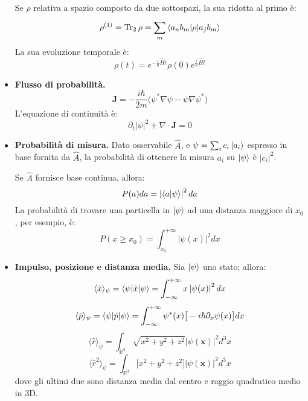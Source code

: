 \documentclass[11pt, a4paper]{scrartcl} %
\numberwithin{equation}{section}
\theoremstyle{style2}
\theoremstyle{style1}
\begin{document}
\begin{multicols}{2}
\begin{itemize}
		Se $\rho $ relativa a spazio composto da due sottospazi, la sua ridotta al primo \`e:
		\begin{equation}
			\rho ^{(1)} = \operatorname{Tr} _2 \rho = \sum_{m}^{} \braket{a_n b_m|\rho |a_j b_m} 
		\end{equation}
		La sua evoluzione temporale \`e:
		\begin{equation}
			\rho (t) = e^{-\frac{i}{\hbar } \hat{H} t } \rho (0) e^{\frac{i}{\hbar }\hat{H} t} 
		\end{equation}
		\item {\sffamily \bfseries Flusso di probabilit\`a.} 
			\begin{equation}
				\mathbf{J} = - \frac{i\hbar }{2m} \big(\psi ^* \nabla \psi - \psi  \nabla \psi ^*\big)
			\end{equation}
			L'equazione di continuit\`a \`e:
			\begin{equation}
				\partial _t \lvert \psi  \rvert ^2 + \nabla \cdot \mathbf{J} = 0
			\end{equation}
		\item {\sffamily \bfseries Probabilit\`a di misura.} Dato osservabile $\hat{A}$, e $\psi = \sum_{i}^{} c_i \ket{a _i} $ espresso in base fornita da $\hat{A}$, la probabilit\`a di ottenere la misura $a_i$ su $\ket{\psi } $ \`e $\lvert c_i \rvert ^2$.

			Se $\hat{A}$ fornisce base continua, allora:
			\begin{equation}
				P(a) da =\left\lvert \braket{a|\psi }  \right\rvert ^2 da 
			\end{equation}
			La probabilit\`a di trovare una particella in $\ket{\psi } $ ad una distanza maggiore di $x_0$, per esempio, \`e:
			\[
			P(x\ge x_0) = \int_{x_0}^{+\infty}  \left\lvert \psi (x) \right\rvert ^2 dx
			\] 
		\item {\sffamily \bfseries Impulso, posizione e distanza media.} Sia $\ket{\psi } $ uno stato; allora:
			\begin{equation*}
				\langle \hat{x} \rangle_\psi = \braket{\psi |\hat{x}|\psi }  = \int_{-\infty} ^{+\infty} x \left\lvert \psi (x) \right\rvert ^2 dx 
			\end{equation*}
			\begin{equation*}
				\langle \hat{p} \rangle_\psi = \braket{\psi |\hat{p}|\psi } = \int_{-\infty} ^{+\infty} \psi ^*(x)\big[-i\hbar \partial _x \psi (x)\big] dx
			\end{equation*}
			\begin{equation*}
					\langle \hat{r} \rangle_\psi = \int_{\mathbb{R}^3} \sqrt{x^2 + y^2 + z^2} \left\lvert \psi (\mathbf{x} ) \right\rvert ^2 d^3x
			\end{equation*}
			\begin{equation*}
				\langle \hat{r}^2 \rangle _\psi = \int_{\mathbb{R}^3} \big[x^2 + y^2 + z^2\big] \left\lvert \psi (\mathbf{x} ) \right\rvert ^2 d^3x
			\end{equation*}
	dove gli ultimi due sono distanza media dal centro e raggio quadratico medio in 3D.


\end{itemize}
\end{multicols}
\end{document}
